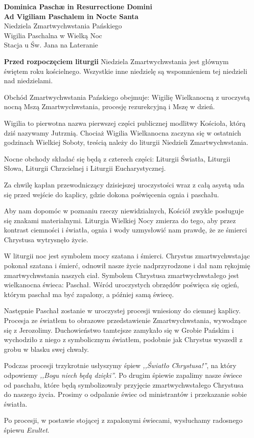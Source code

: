 \documentclass[10pt,oneside,final,notitlepage,a4paper,wide]{mwart}
\begin{document}
%
\begin{center}
	\LARGE{\textbf{Dominica Paschæ in Resurrectione Domini\\Ad Vigiliam Paschalem in Nocte Santa}}\\ \smallskip
	\small{Niedziela Zmartwychwstania Pańskiego\\Wigilia Paschalna w Wielką Noc\\ \smallskip Stacja u Św. Jana na Lateranie}
\end{center} \vspace{1cm}

	\textbf{Przed rozpoczęciem liturgii} Niedziela Zmartwychwstania jest głównym świętem roku kościelnego. Wszystkie inne niedzielę są wspomnieniem tej niedzieli nad niedzielami.
\par Obchód Zmartwychwstania Pańskiego obejmuje: Wigilię Wielkanocną z uroczystą nocną Mszą Zmartwychwstania, procesję rezurekcyjną i Mszę w dzień.
\par Wigilia to pierwotna nazwa pierwszej części publicznej modlitwy Kościoła, którą dziś nazywamy Jutrznią. Chociaż Wigilia Wielkanocna zaczyna się w ostatnich godzinach Wielkiej Soboty, treścią należy do liturgii Niedzieli Zmartwychwstania.
\par Nocne obchody składać się będą z czterech części: Liturgii Światła, Liturgii Słowa, Liturgii Chrzcielnej i Liturgii Eucharystycznej.
\par Za chwilę kapłan przewodniczący dzisiejszej uroczystości wraz z całą asystą uda się przed wejście do kaplicy, gdzie dokona poświęcenia ognia i paschału.
\par Aby nam dopomóc w poznaniu rzeczy niewidzialnych, Kościół zwykle posługuje się znakami materialnymi. Liturgia Wielkiej Nocy zmierza do tego, aby przez kontrast ciemności i światła, ognia i wody uzmysłowić nam prawdę, że ze śmierci Chrystusa wytrysnęło życie.
\par W liturgii noc jest symbolem mocy szatana i śmierci. Chrystus zmartwychwstając pokonał szatana i śmierć, odnowił nasze życie nadprzyrodzone i dał nam rękojmię zmartwychwstania naszych ciał. Symbolem Chrystusa zmartwychwstałego jest wielkanocna świeca: Paschał. Wśród uroczystych obrzędów poświęca się ogień, którym paschał ma być zapalony, a później samą świecę.
\par Następnie Paschał zostanie w uroczystej procesji wniesiony do ciemnej kaplicy. Procesja ze światłem to obrazowe przedstawienie Zmartwychwstania, wywodzące się z Jerozolimy. Duchowieństwo tamtejsze zamykało się w Grobie Pańskim i wychodziło z niego z symbolicznym światłem, podobnie jak Chrystus wyszedł z grobu w blasku swej chwały.
\par Podczas procesji trzykrotnie usłyszymy śpiew \emph{,,Światło Chrystusa!''}, na który odpowiemy \emph{,,Bogu niech będą dzięki''}. Po drugim śpiewie zapalimy nasze świece od paschału, które będą symbolizowały przyjęcie zmartwychwstałego Chrystusa do naszego życia. Prosimy o odpalanie świec od ministrantów i przekazanie sobie światła.
\par Po procesji, w postawie stojącej z zapalonymi świecami, wysłuchamy radosnego śpiewu \emph{Exultet}. \bigskip
\end{document}
